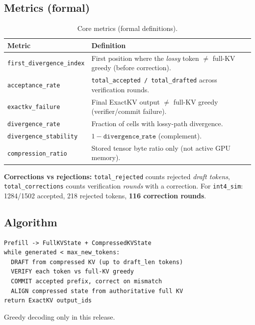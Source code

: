 \documentclass[11pt]{article}
\begin{document}
\subsection{Metrics (formal)}
\begin{table}[htbp]
\centering\small
\caption{Core metrics (formal definitions).}
\label{tab:metrics-formal}
\begin{tabularx}{\textwidth}{@{}>{\raggedright\arraybackslash}p{}>{\raggedright\arraybackslash}X@{}}
\toprule
\textbf{Metric} & \textbf{Definition} \\ \midrule
\texttt{first\_divergence\_index} &
  First position where the \emph{lossy} token $\neq$ full-KV greedy (before correction). \\
\texttt{acceptance\_rate} &
  \texttt{total\_accepted / total\_drafted} across verification rounds. \\
\texttt{exactkv\_failure} &
  Final ExactKV output $\neq$ full-KV greedy (verifier/commit failure). \\
\texttt{divergence\_rate} &
  Fraction of cells with lossy-path divergence. \\
\texttt{divergence\_stability} &
  $1 - \texttt{divergence\_rate}$ (complement). \\
\texttt{compression\_ratio} &
  Stored tensor byte ratio only (not active GPU memory). \\
\bottomrule
\end{tabularx}
\end{table}

\begin{sloppypar}
\textbf{Corrections vs rejections:} \texttt{total\_rejected} counts rejected
\emph{draft tokens}, \texttt{total\_corrections} counts verification \emph{rounds}
with a correction. For \texttt{int4\_sim}: 1284/1502 accepted, 218 rejected tokens,
\textbf{116 correction rounds}.
\end{sloppypar}

\subsection{Algorithm}
\begin{verbatim}
Prefill -> FullKVState + CompressedKVState
while generated < max_new_tokens:
  DRAFT from compressed KV (up to draft_len tokens)
  VERIFY each token vs full-KV greedy
  COMMIT accepted prefix, correct on mismatch
  ALIGN compressed state from authoritative full KV
return ExactKV output_ids
\end{verbatim}
Greedy decoding only in this release.
\end{document}
